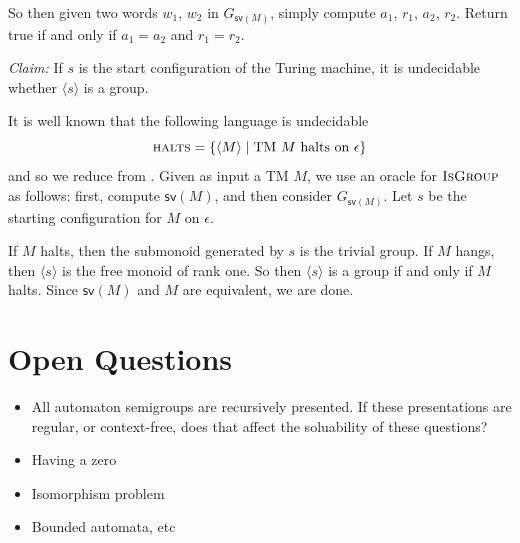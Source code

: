 \documentclass[11pt]{article}
\begin{document}
So then given two words $w_1$, $w_2$ in $G_{\textsf{sv}(M)}$, simply
compute $a_1$, $r_1$, $a_2$, $r_2$. Return true if and only if $a_1 = a_2$ and $r_1 = r_2$.

\textit{Claim:} If $s$ is the start configuration of the Turing
machine, it is undecidable whether $\langle s \rangle$ is a group.

It is well known that the following language is undecidable
\[
  \textsc{halts} = \{\langle M \rangle \mid \text{TM $M$ halts on
    $\epsilon$} \}
\]
and so we reduce from . Given as input a TM $M$, we use
an oracle for $\textsc{IsGroup}$ as follows: first, compute
$\textsf{sv}(M)$, and then consider $G_{\textsf{sv}(M)}$. Let $s$ be
the starting configuration for $M$ on $\epsilon$.

If $M$ halts, then the submonoid generated by $s$ is the trivial
group. If $M$ hangs, then $\langle s \rangle$ is the free monoid of
rank one. So then $\langle s \rangle$ is a group if and only if $M$
halts. Since $\textsf{sv}(M)$ and $M$ are equivalent, we are done.

\section{Open Questions}

\begin{itemize}
\item All automaton semigroups are recursively presented. If these
  presentations are regular, or context-free, does that affect the
  soluability of these questions?
\item Having a zero
\item Isomorphism problem
\item Bounded automata, etc
\end{itemize}

\nocite{*}

\end{document}
